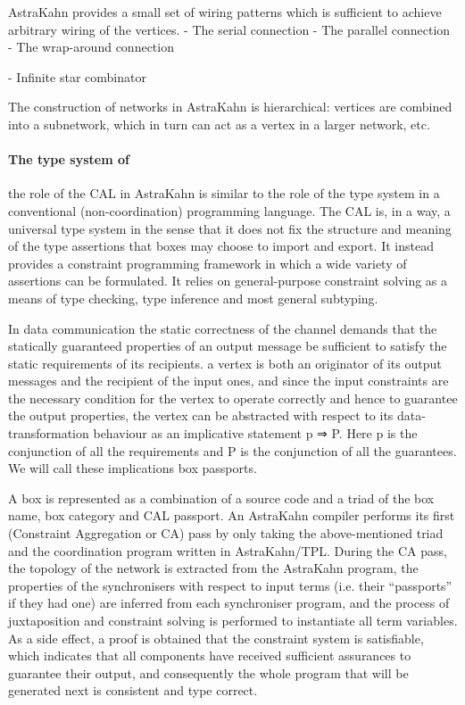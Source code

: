 AstraKahn provides a small set of wiring patterns which is sufficient to achieve arbitrary wiring of the vertices.
- The serial connection
- The parallel connection
- The wrap-around connection

- Infinite star combinator


The construction of networks in AstraKahn is hierarchical: vertices are combined into a subnetwork, which in turn can act as a vertex in a larger network, etc.


\paragraph{The type system of \ak\ }

the role of the CAL in AstraKahn is similar to the role
of the type system in a conventional (non-coordination) programming language. The CAL is, in a way, a universal type system in the sense that it does not fix the structure and meaning of the type assertions that boxes may choose to import and export. It instead provides a constraint programming framework in which a wide variety of assertions can be formulated. It relies on general-purpose constraint solving as a means of type checking, type inference and most general subtyping.

In data communication the static correctness of the channel demands that the statically guaranteed properties of an output message be sufficient to satisfy the static requirements of its recipients.
a vertex is both an originator of its output messages and the recipient of the input ones, and since the input constraints are the necessary condition for the vertex to operate correctly and hence to guarantee the output properties, the vertex can be abstracted with
respect to its data-transformation behaviour as an implicative statement p ⇒ P. Here p is the conjunction of all the requirements and P is the conjunction of all the guarantees. We will call these implications box passports.

A box is represented as a combination of a source code and a triad of the box name, box category and CAL passport. An AstraKahn compiler performs its first (Constraint Aggregation or CA) pass by only taking the above-mentioned triad and the coordination program written in AstraKahn/TPL. During the CA pass, the topology of the network is extracted from the AstraKahn program, the properties of the synchronisers with respect to input terms (i.e. their “passports” if they had one) are inferred from each synchroniser program, and the process of juxtaposition and constraint solving is performed to instantiate all term variables. As a side effect, a proof is obtained that the constraint system is satisfiable, which indicates that all components have received sufficient assurances to guarantee their output, and consequently the whole program that will be generated next is consistent and type correct.

